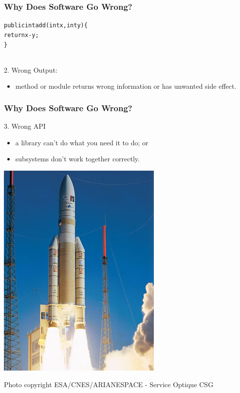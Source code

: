 \documentclass{beamer}
\newenvironment{changemargin}[1]{%
  \begin{list}{}{%
    \setlength{\topsep}{0pt}%
    \setlength{\leftmargin}{#1}%
    \setlength{\rightmargin}{1em}
    \setlength{\listparindent}{\parindent}%
    \setlength{\itemindent}{\parindent}%
    \setlength{\parsep}{\parskip}%
  }%
  \item[]}{\end{list}}
\begin{document}
\begin{frame}

  \frametitle{Why Does Software Go Wrong?}

\begin{changemargin}{2em}
\begin{alltt}
    public int add(int x, int y) \{ \\
\qquad      return x - y; \\
\}

\end{alltt}
~\\[1em]
\Large
  2. Wrong Output:
\begin{itemize}
  \item method or module returns wrong information or has unwanted side effect.
\end{itemize}
\end{changemargin}

\end{frame}

\begin{frame}

  \frametitle{Why Does Software Go Wrong?}

  \begin{changemargin}{2em}
    3. Wrong API
\begin{itemize}
  \item a library can't do what you need it to do; or
  \item subsystems don't work together correctly.
\end{itemize}

\begin{center}
\includegraphics[height=.5\textheight]{L01/s2_2sm.jpg}
\end{center}

{\tiny Photo copyright ESA/CNES/ARIANESPACE - Service Optique CSG}
  \end{changemargin}
  
\end{frame}
\end{document}
